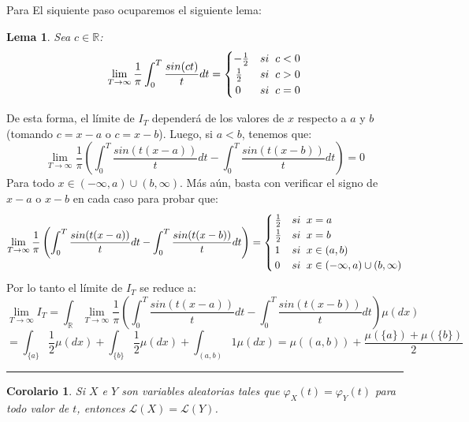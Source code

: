 \documentclass[a4paper]{article}
\newtheorem{lem}{Lema}
\newtheorem{cor}{Corolario}
\numberwithin{equation}{subsection}
\def\R{\mathbb R}
\def\to{\rightarrow}
\begin{document}
Para El siquiente paso ocuparemos el siguiente lema:
\begin{lem} Sea $c\in\R$:
\[\lim_{T \to \infty}\frac{1}{\pi}\int_{0}^{T}\frac{sin(ct)}{t}dt = \begin{cases}
                -\frac{1}{2} & si\hspace{0.2cm}c<0\\
                \,\frac{1}{2} & si\hspace{0.2cm}c>0\\
                \,0 & si\hspace{0.2cm} c=0
                \end{cases}\]
\end{lem}
De esta forma, el límite de $I_T$ dependerá de los valores de $x$ respecto a $a$ y $b$ (tomando $c=x-a$ o $c=x-b$). Luego, si $a<b$, tenemos que:
\[\lim_{T\to \infty}\frac{1}{\pi}\left(\int_{0}^{T}\frac{sin(t(x-a))}{t}dt - \int_{0}^{T}\frac{sin(t(x-b))}{t}dt\right) = 0\]
Para todo $x \in (-\infty ,a)\cup (b,\infty)$. Más aún, basta con verificar el signo de $x-a$ o $x-b$ en cada caso para probar que:
\[\lim_{T\to \infty}\frac{1}{\pi}\left(\int_{0}^{T}\frac{sin(t(x-a))}{t}dt - \int_{0}^{T}\frac{sin(t(x-b))}{t}dt\right) = \begin{cases}
\,\frac{1}{2} & si\hspace{0.2cm}x=a\\
\,\frac{1}{2} & si\hspace{0.2cm}x=b\\
\,1 & si\hspace{0.2cm}x\in(a,b)\\
\,0 & si\hspace{0.2cm}x\in(-\infty,a)\cup(b,\infty)
\end{cases}\]
Por lo tanto el límite de $I_T$ se reduce a:
\[\lim_{T\to \infty}I_T = \int_{\R}\lim_{T\to \infty}\frac{1}{\pi}\left(\int_{0}^{T}\frac{sin(t(x-a))}{t}dt - \int_{0}^{T}\frac{sin(t(x-b))}{t}dt\right)\mu(dx)\]
\[= \int_{\{a\}}\frac{1}{2}\mu(dx) + \int_{\{b\}}\frac{1}{2}\mu(dx) + \int_{(a,b)}1\mu(dx) = \mu((a,b)) + \frac{\mu(\{a\})+\mu(\{b\})}{2}\]
\rule{0.7em}{0.7em}

\begin{cor}
Si $X$ e $Y$ son variables aleatorias tales que $\varphi_X(t) = \varphi_Y(t)$ para todo valor de $t$, entonces $\mathcal{L}(X)=\mathcal{L}(Y)$.
\end{cor}
\end{document}
